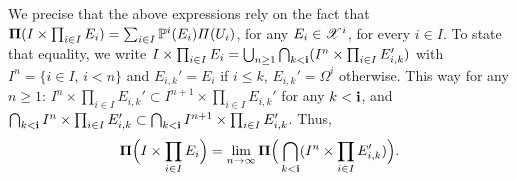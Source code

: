 
We precise that the above expressions rely on the fact that $\mathbf{\Pi}(I\times\prod_{i\in I}E_i)=\sum_{i\in I}\mathbb{P}^i(E_i)\varPi(U_i)$, for any $E_i\in\mathscr{X}^i$, for every ${i\in I}$. To state that equality, we write $I\times\prod_{i\in I}E_i=\bigcup_{n\geq1}\bigcap_{k<\mathbf{i}}(I^n\times\prod_{i\in I}E_{i,k}') $ with $I^n=\{i\in I,\,i< n\}$ and $E_{i,k}'=E_i$ if $i\leq k$, $E_{i,k}'=\Omega^i$ otherwise. This way for any $n\geq1$:
$I^n\times\prod_{i\in I} E_{i,k}' \subset I^{n+1}\times\prod_{i\in I} E_{i,k}'$ for any $k<\mathbf{i}$, and
$        \bigcap_{k<\mathbf{i}} I^n\times\prod_{i\in I} E_{i,k}'\subset \bigcap_{k<\mathbf{i}} I^{n+1}\times\prod_{i\in I} E_{i,k}'$.
Thus,
    \begin{equation}\label{eq:proofKolmLimPiCup}
        \mathbf{\Pi}\Big(I\times\prod_{i\in I}E_i\Big) 
            = \lim_{n\rightarrow\infty}\mathbf{\Pi}\Big(\bigcap_{k<\mathbf{i}}(I^n\times\prod_{i\in I}E_{i,k}')\Big).
    \end{equation}


